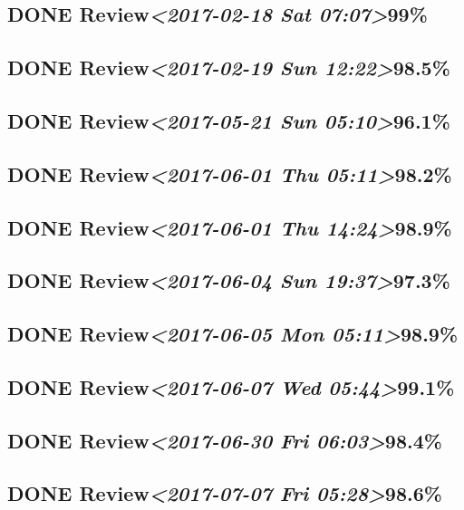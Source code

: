 \documentclass[11pt]{ctexart}
\begin{document}
\subsection{{\bfseries\sffamily DONE} Review\textit{<2017-02-18 Sat 07:07>}99\%}
\label{sec:org6f62b32}
\subsection{{\bfseries\sffamily DONE} Review\textit{<2017-02-19 Sun 12:22>}98.5\%}
\label{sec:org44c5e55}
\subsection{{\bfseries\sffamily DONE} Review\textit{<2017-05-21 Sun 05:10>}96.1\%}
\label{sec:org45c71da}
\subsection{{\bfseries\sffamily DONE} Review\textit{<2017-06-01 Thu 05:11>}98.2\%}
\label{sec:org5d0ff10}
\subsection{{\bfseries\sffamily DONE} Review\textit{<2017-06-01 Thu 14:24>}98.9\%}
\label{sec:orgc097c39}
\subsection{{\bfseries\sffamily DONE} Review\textit{<2017-06-04 Sun 19:37>}97.3\%}
\label{sec:orgd297d84}
\subsection{{\bfseries\sffamily DONE} Review\textit{<2017-06-05 Mon 05:11>}98.9\%}
\label{sec:org7f5a586}
\subsection{{\bfseries\sffamily DONE} Review\textit{<2017-06-07 Wed 05:44>}99.1\%}
\label{sec:org9767cbc}
\subsection{{\bfseries\sffamily DONE} Review\textit{<2017-06-30 Fri 06:03>}98.4\%}
\label{sec:orge1698ad}
\subsection{{\bfseries\sffamily DONE} Review\textit{<2017-07-07 Fri 05:28>}98.6\%}
\label{sec:org2b355a2}
\end{document}
